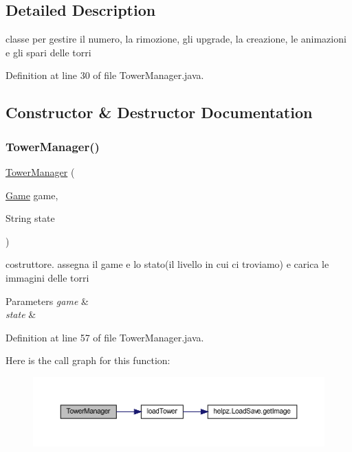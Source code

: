 \subsection{Detailed Description}
classe per gestire il numero, la rimozione, gli upgrade, la creazione, le animazioni e gli spari delle torri 

Definition at line 30 of file Tower\+Manager.\+java.



\subsection{Constructor \& Destructor Documentation}
\mbox{\label{classmanagers_1_1_tower_manager_a520c6411e4fe9307be91f5a8c7d8b774}} 
\subsubsection{\texorpdfstring{Tower\+Manager()}{TowerManager()}}
{\footnotesize\ttfamily \hyperlink{classmanagers_1_1_tower_manager}{Tower\+Manager} (\begin{DoxyParamCaption}\item[{\hyperlink{classprogetto_1_1_game}{Game}}]{game,  }\item[{String}]{state }\end{DoxyParamCaption})}



costruttore. assegna il game e lo stato(il livello in cui ci troviamo) e carica le immagini delle torri 


\begin{DoxyParams}{Parameters}
{\em game} & \\
\hline
{\em state} & \\
\hline
\end{DoxyParams}


Definition at line 57 of file Tower\+Manager.\+java.

Here is the call graph for this function\+:\nopagebreak
\begin{figure}[H]
\begin{center}
\leavevmode
\includegraphics[width=350pt]{classmanagers_1_1_tower_manager_a520c6411e4fe9307be91f5a8c7d8b774_cgraph}
\end{center}
\end{figure}


